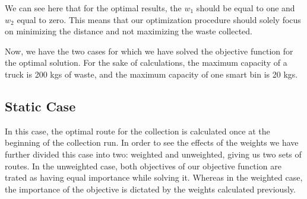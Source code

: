 \documentclass[12pt]{article}
\begin{document}
We can see here that for the optimal results, the $w_1$ should be equal to one and $w_2$ equal to zero. This means that our optimization procedure should solely focus on minimizing the distance and not maximizing the waste collected.

Now, we have the two cases for which we have solved the objective function for the optimal solution. For the sake of calculations, the maximum capacity of a truck is 200 kgs of waste, and the maximum capacity of one smart bin is 20 kgs.

\subsection*{Static Case}
In this case, the optimal route for the collection is calculated once at the beginning of the collection run. In order to see the effects of the weights we have further divided this case into two: weighted and unweighted, giving us two sets of routes. In the unweighted case, both objectives of our objective function are trated as having equal importance while solving it. Whereas in the weighted case, the importance of the objective is dictated by the weights calculated previously.
\end{document}
